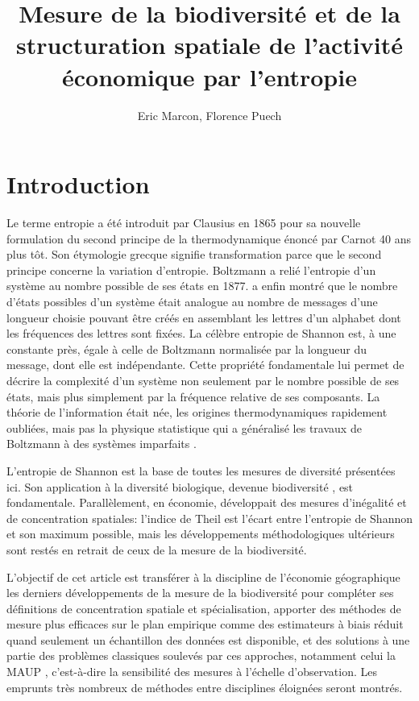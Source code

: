 \documentclass[a4paper]{article}
\title{Mesure de la biodiversité et de la structuration spatiale de l'activité économique par l'entropie}
\author{Eric Marcon, Florence Puech}
\begin{document}


\maketitle


\section{Introduction}

Le terme \og entropie\fg{} a été introduit par Clausius en 1865 pour sa nouvelle formulation du second principe de la thermodynamique énoncé par Carnot 40 ans plus tôt.
Son étymologie grecque signifie transformation parce que le second principe concerne la variation d'entropie.
Boltzmann a relié l'entropie d'un système au nombre possible de ses états en 1877.
\cite{Shannon1948} a enfin montré que le nombre d'états possibles d'un système était analogue au nombre de messages d'une longueur choisie pouvant être créés en assemblant les lettres d'un alphabet dont les fréquences des lettres sont fixées.
La célèbre entropie de Shannon est, à une constante près, égale à celle de Boltzmann normalisée par la longueur du message, dont elle est indépendante.
Cette propriété fondamentale lui permet de décrire la complexité d'un système non seulement par le nombre possible de ses états, mais plus simplement par la fréquence relative de ses composants.
La théorie de l'information était née, les origines thermodynamiques rapidement oubliées, mais pas la physique statistique qui a généralisé les travaux de Boltzmann à des systèmes imparfaits \citep{Tsallis1988}.

L'entropie de Shannon est la base de toutes les mesures de diversité présentées ici.
Son application à la diversité biologique, devenue biodiversité \citep{Wilson1988}, est fondamentale.
Parallèlement, en économie, \cite{Theil1967} développait des mesures d'inégalité et de concentration spatiales: l'indice de Theil est l'écart entre l'entropie de Shannon et son maximum possible, mais les développements méthodologiques ultérieurs sont restés en retrait de ceux de la mesure de la biodiversité.

L'objectif de cet article est transférer à la discipline de l'économie géographique les derniers développements de la mesure de la biodiversité pour compléter ses définitions de concentration spatiale et spécialisation, apporter des méthodes de mesure plus efficaces sur le plan empirique comme des estimateurs à biais réduit quand seulement un échantillon des données est disponible, et des solutions à une partie des problèmes classiques soulevés par ces approches, notamment celui la MAUP \citep[\foreignlanguage{english}{\emph{Modifiable Areal Unit Problem}}]{Openshaw1979}, c'est-à-dire la sensibilité des mesures à l'échelle d'observation.
Les emprunts très nombreux de méthodes entre disciplines éloignées seront montrés.
\end{document}
